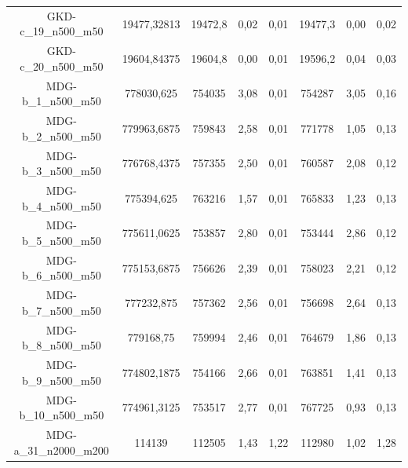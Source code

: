 \begin{table}[H]
{\begin{tabular}{@{}cccccccc@{}}
			GKD-c\_19\_n500\_m50   & 19477,32813          & 19472,8         & 0,02           & 0,01                 & 19477,3     & 0,00           & 0,02             \\
			GKD-c\_20\_n500\_m50   & 19604,84375          & 19604,8         & 0,00           & 0,01                 & 19596,2     & 0,04           & 0,03             \\
			MDG-b\_1\_n500\_m50    & 778030,625           & 754035          & 3,08           & 0,01                 & 754287      & 3,05           & 0,16             \\
			MDG-b\_2\_n500\_m50    & 779963,6875          & 759843          & 2,58           & 0,01                 & 771778      & 1,05           & 0,13             \\
			MDG-b\_3\_n500\_m50    & 776768,4375          & 757355          & 2,50           & 0,01                 & 760587      & 2,08           & 0,12             \\
			MDG-b\_4\_n500\_m50    & 775394,625           & 763216          & 1,57           & 0,01                 & 765833      & 1,23           & 0,13             \\
			MDG-b\_5\_n500\_m50    & 775611,0625          & 753857          & 2,80           & 0,01                 & 753444      & 2,86           & 0,12             \\
			MDG-b\_6\_n500\_m50    & 775153,6875          & 756626          & 2,39           & 0,01                 & 758023      & 2,21           & 0,12             \\
			MDG-b\_7\_n500\_m50    & 777232,875           & 757362          & 2,56           & 0,01                 & 756698      & 2,64           & 0,13             \\
			MDG-b\_8\_n500\_m50    & 779168,75            & 759994          & 2,46           & 0,01                 & 764679      & 1,86           & 0,13             \\
			MDG-b\_9\_n500\_m50    & 774802,1875          & 754166          & 2,66           & 0,01                 & 763851      & 1,41           & 0,13             \\
			MDG-b\_10\_n500\_m50   & 774961,3125          & 753517          & 2,77           & 0,01                 & 767725      & 0,93           & 0,13             \\
			MDG-a\_31\_n2000\_m200 & 114139               & 112505          & 1,43           & 1,22                 & 112980      & 1,02           & 1,28             \\

\end{tabular}}
\end{table}
